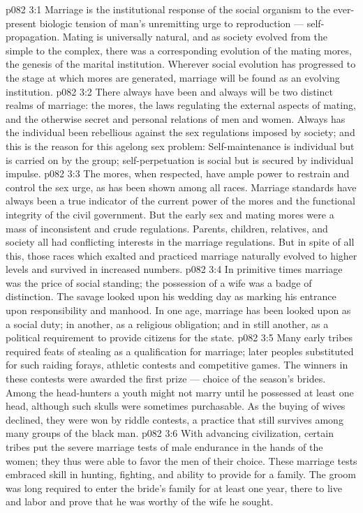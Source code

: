 \vs p082 3:1 Marriage is the institutional response of the social organism to the ever\hyp{}present biologic tension of man’s unremitting urge to reproduction --- self\hyp{}propagation. Mating is universally natural, and as society evolved from the simple to the complex, there was a corresponding evolution of the mating mores, the genesis of the marital institution. Wherever social evolution has progressed to the stage at which mores are generated, marriage will be found as an evolving institution.
\vs p082 3:2 There always have been and always will be two distinct realms of marriage: the mores, the laws regulating the external aspects of mating, and the otherwise secret and personal relations of men and women. Always has the individual been rebellious against the sex regulations imposed by society; and this is the reason for this agelong sex problem: Self\hyp{}maintenance is individual but is carried on by the group; self\hyp{}perpetuation is social but is secured by individual impulse.
\vs p082 3:3 The mores, when respected, have ample power to restrain and control the sex urge, as has been shown among all races. Marriage standards have always been a true indicator of the current power of the mores and the functional integrity of the civil government. But the early sex and mating mores were a mass of inconsistent and crude regulations. Parents, children, relatives, and society all had conflicting interests in the marriage regulations. But in spite of all this, those races which exalted and practiced marriage naturally evolved to higher levels and survived in increased numbers.
\vs p082 3:4 \pc In primitive times marriage was the price of social standing; the possession of a wife was a badge of distinction. The savage looked upon his wedding day as marking his entrance upon responsibility and manhood. In one age, marriage has been looked upon as a social duty; in another, as a religious obligation; and in still another, as a political requirement to provide citizens for the state.
\vs p082 3:5 Many early tribes required feats of stealing as a qualification for marriage; later peoples substituted for such raiding forays, athletic contests and competitive games. The winners in these contests were awarded the first prize --- choice of the season’s brides. Among the head\hyp{}hunters a youth might not marry until he possessed at least one head, although such skulls were sometimes purchasable. As the buying of wives declined, they were won by riddle contests, a practice that still survives among many groups of the black man.
\vs p082 3:6 With advancing civilization, certain tribes put the severe marriage tests of male endurance in the hands of the women; they thus were able to favor the men of their choice. These marriage tests embraced skill in hunting, fighting, and ability to provide for a family. The groom was long required to enter the bride’s family for at least one year, there to live and labor and prove that he was worthy of the wife he sought.
